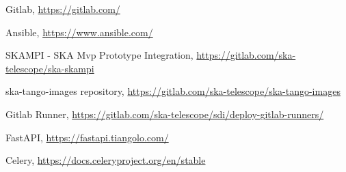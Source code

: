 \documentclass[a4paper,
               keeplastbox,   %
               ]{jacow}
\begin{document}
{\begin{thebibliography}{99}
		Gitlab,
		\url{https://gitlab.com/}

		Ansible,
		\url{https://www.ansible.com/}

		SKAMPI - SKA Mvp Prototype Integration,
		\url{https://gitlab.com/ska-telescope/ska-skampi}

		ska-tango-images repository,
		\url{https://gitlab.com/ska-telescope/ska-tango-images}

		Gitlab Runner,
		\url{https://gitlab.com/ska-telescope/sdi/deploy-gitlab-runners/}
		
		FastAPI,
		\url{https://fastapi.tiangolo.com/}
	
		Celery,
		\url{https://docs.celeryproject.org/en/stable}


	\end{thebibliography}
}
 
\end{document}

